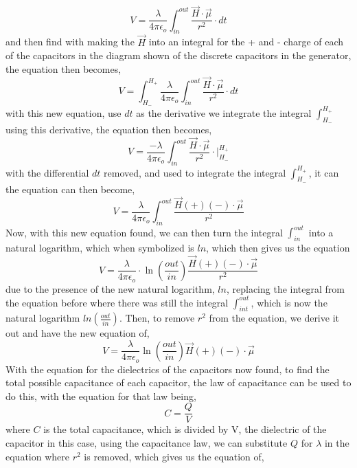 \documentclass[]{article}
\begin{document}
\begin{equation}
V =\frac{\lambda}{4\pi\epsilon_o}\int_{in}^{out} \frac{\vec{H}\cdot \vec{\mu}}{r^2} \cdot dt
\end{equation}
and then find with making the $\vec{H}$ into an integral for the + and - charge of each of the capacitors in the diagram shown of the discrete capacitors in the generator, the equation then becomes,
\begin{equation}
V = \int_{H_-}^{H_+} \frac{\lambda}{4\pi\epsilon_o}\int_{in}^{out}\frac{\vec{H} \cdot \vec{\mu}}{r^2} \cdot dt
\end{equation}
with this new equation, use $dt$ as the derivative we integrate the integral $\int_{H_-}^{H_+}$ using this derivative, the equation then becomes,
\begin{equation}
V = \frac{-\lambda}{4\pi\epsilon_o} \int_{in}^{out}\frac{\vec{H} \cdot \vec{\mu}}{r^2} \cdot \biggr|_{H_{-}}^{H_{+}}
\end{equation}
with the differential $dt$ removed, and used to integrate the integral $\int_{H_-}^{H_+}$, it can the equation can then become,
\begin{equation}
V = \frac{\lambda}{4\pi\epsilon_o}\int_{in}^{out} \frac{\vec{H}(+)(-) \cdot \vec{\mu}}{r^2}
\end{equation}
Now, with this new equation found, we can then turn the integral $\int_{in}^{out}$ into a natural logarithm, which when symbolized is $ln$, which then gives us the equation
\begin{equation}
V = \frac{\lambda}{4\pi\epsilon_o} \cdot \ln(\frac{out}{in})\frac{\vec{H}(+)(-) \cdot \vec{\mu}}{r^2}
\end{equation}
due to the presence of the new natural logarithm, $ln$, replacing the integral from the equation before where there was still the integral $\int_{int}^{out}$, which is now the natural logarithm $ln(\frac{out}{in})$. Then, to remove $r^2$ from the equation, we derive it out and have the new equation of, 
\begin{equation}
V = \frac{\lambda}{4\pi\epsilon_o} \ln(\frac{out}{in})\vec{H}(+)(-)\cdot \vec{\mu}
\end{equation}
With the equation for the dielectrics of the capacitors now found, to find the total possible capacitance of each capacitor, the law of capacitance can be used to do this, with the equation for that law being,
\begin{equation}
C = \frac{Q}{V} 
\end{equation}
where $C$ is the total capacitance, which is divided by V, the dielectric of the capacitor in this case, using the capacitance law, we can substitute $Q$ for $\lambda$ in the equation  where $r^2$ is removed, which gives us the equation of,
\end{document}
